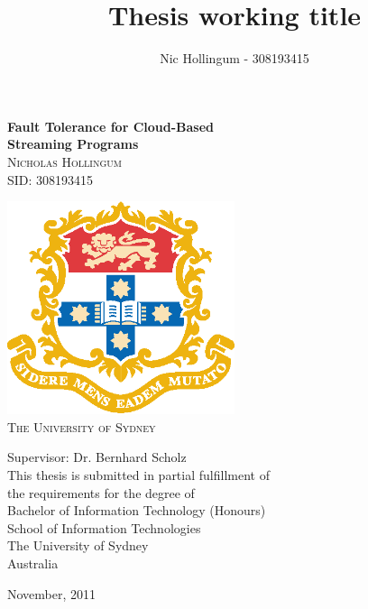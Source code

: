 \documentclass{report}
\author{Nic Hollingum - 308193415}
\title{Thesis working title}
\begin{document}
\addtolength{\headheight}{2.5pt}
\onehalfspace
\pagestyle{fancy}
\fancyhead{} %
\fancyhead[RE,LO]{\slshape \leftmark}
\fancyfoot{} %
\fancyfoot[C]{\thepage}
\renewcommand{\chaptermark}[1]{
\markboth{\thechapter.\ #1}{}}
\renewcommand{\headrulewidth}{0.4pt}
\renewcommand{\footrulewidth}{0.4pt}


\newcommand{\HRule}{\rule{\linewidth}{0.5mm}}
\begin{titlepage}
\begin{center}

	{\huge \bfseries Fault Tolerance for Cloud-Based}
	\\[0.3cm]
	{\huge \bfseries Streaming Programs}
	\\[0.6cm]
	
	\textsc{\LARGE 	Nicholas Hollingum	\\
					SID: 308193415		\\[0.6cm]}
	
	\includegraphics[width=0.50\textwidth]{figures/usyd.eps}\\[0.2cm]
  
  \textsc{\LARGE The University of Sydney}\\[0.8cm]
  
  
  \begin{center}
  \large Supervisor: Dr. Bernhard Scholz\\[0.4cm]

  This thesis is submitted in partial fulfillment of\\
  the requirements for the degree of\\
  Bachelor of Information Technology (Honours)\\[0.5cm]

  \Large School of Information Technologies\\
  The University of Sydney\\
  Australia
  \end{center}
  \vfill
  {\large November, 2011}
\end{center}
\end{titlepage}
\newpage
\newpage




\tableofcontents















\end{document}
